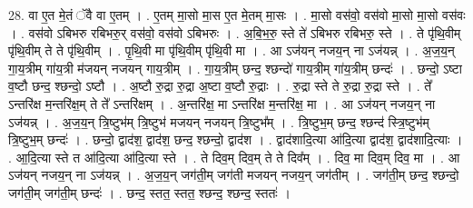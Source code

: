 \documentclass[17pt]{extarticle}
\begin{document}
28. वा ए॒त मे॒तं ॅवै वा ए॒तम् । . ए॒तम् मा॒सो मा॒स ए॒त मे॒तम् मा॒सः । . मा॒सो वस॑वो॒ वस॑वो मा॒सो मा॒सो वस॑वः । . वस॑वो ऽबिभरु रबिभरु॒र् वस॑वो॒ वस॑वो ऽबिभरुः । . अ॒बि॒भ॒रु॒ स्ते ते॑ ऽबिभरु रबिभरु॒ स्ते । . ते पृ॑थि॒वीम् पृ॑थि॒वीम् ते ते पृ॑थि॒वीम् । . पृ॒थि॒वी मा पृ॑थि॒वीम् पृ॑थि॒वी मा । . आ ऽज॑यन् नजय॒न् ना ऽज॑यन्न् । . अ॒ज॒य॒न् गा॒य॒त्रीम् गा॑य॒त्री म॑जयन् नजयन् गाय॒त्रीम् । . गा॒य॒त्रीम् छन्द॒ श्छन्दो॑ गाय॒त्रीम् गा॑य॒त्रीम् छन्दः॑ । . छन्दो॒ ऽष्टा व॒ष्टौ छन्द॒ श्छन्दो॒ ऽष्टौ । . अ॒ष्टौ रु॒द्रा रु॒द्रा अ॒ष्टा व॒ष्टौ रु॒द्राः । . रु॒द्रा स्ते ते रु॒द्रा रु॒द्रा स्ते । . ते᳚ ऽन्तरि॑क्ष म॒न्तरि॑क्ष॒म् ते ते᳚ ऽन्तरि॑क्षम् । . अ॒न्तरि॑क्ष॒ मा ऽन्तरि॑क्ष म॒न्तरि॑क्ष॒ मा । . आ ऽज॑यन् नजय॒न् ना ऽज॑यन्न् । . अ॒ज॒य॒न् त्रि॒ष्टुभ॑म् त्रि॒ष्टुभ॑ मजयन् नजयन् त्रि॒ष्टुभ᳚म् । . त्रि॒ष्टुभ॒म् छन्द॒ श्छन्द॑ स्त्रि॒ष्टुभ॑म् त्रि॒ष्टुभ॒म् छन्दः॑ । . छन्दो॒ द्वाद॑श॒ द्वाद॑श॒ छन्द॒ श्छन्दो॒ द्वाद॑श । . द्वाद॑शादि॒त्या आ॑दि॒त्या द्वाद॑श॒ द्वाद॑शादि॒त्याः । . आ॒दि॒त्या स्ते त आ॑दि॒त्या आ॑दि॒त्या स्ते । . ते दिव॒म् दिव॒म् ते ते दिव᳚म् । . दिव॒ मा दिव॒म् दिव॒ मा । . आ ऽज॑यन् नजय॒न् ना ऽज॑यन्न् । . अ॒ज॒य॒न् जग॑ती॒म् जग॑ती मजयन् नजय॒न् जग॑तीम् । . जग॑ती॒म् छन्द॒ श्छन्दो॒ जग॑ती॒म् जग॑ती॒म् छन्दः॑ । . छन्द॒ स्तत॒ स्तत॒ श्छन्द॒ श्छन्द॒ स्ततः॑ । \newline
\end{document}
